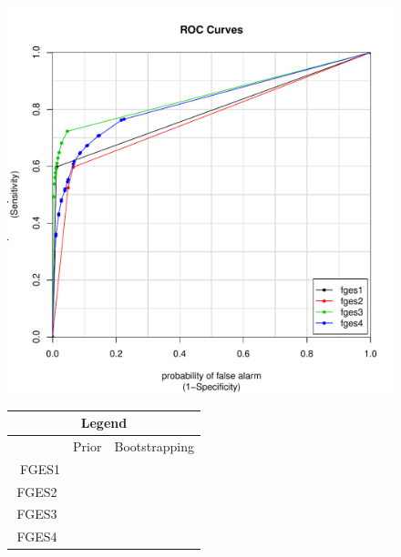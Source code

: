 \documentclass[a4paper,pdf]{article}
\newcommand{\cmark}{\color{green}{\ding{51}}}%
\newcommand{\xmark}{\color{red}{\ding{55}}}
\begin{document}
\begin{figure}[!ht]
    \centering
        \centering
        \begin{minipage}{0.6\textwidth}
            \centering
            \includegraphics[width=\textwidth]{combinedSimCurvesfgessim}%
        \end{minipage}\hfill
        \begin{minipage}{0.4\textwidth}
            \centering
            \renewcommand{\arraystretch}{1}
            \setlength{\tabcolsep}{5pt}
            \begin{tabular}{|c|c|c|}
                \multicolumn{3}{c}{\large{\textbf{Legend}}}\\
                \hline
                       & Prior & Bootstrapping\\\
                 FGES1 & \cmark & \xmark\\
                 FGES2 & \xmark & \xmark\\
                 FGES3 & \cmark & \cmark \\
                 FGES4 & \xmark & \cmark\\
                 \hline
            \end{tabular}
        \end{minipage}

\end{figure}
\end{document}
